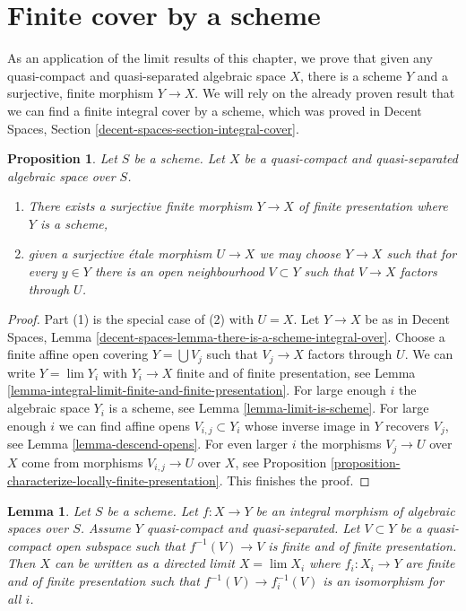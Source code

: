 \documentclass{stacks-project}
\theoremstyle{plain}
\newtheorem{proposition}[subsection]{Proposition}
\newtheorem{lemma}[subsection]{Lemma}
\theoremstyle{definition}
\theoremstyle{remark}
\numberwithin{equation}{subsection}
\def\lim{\mathop{\mathrm{lim}}\nolimits}
\begin{document}
\section{Finite cover by a scheme}
\label{section-finite-cover}

\noindent
As an application of the limit results of this chapter, we prove that given
any quasi-compact and quasi-separated algebraic space $X$, there is a scheme
$Y$ and a surjective, finite morphism $Y \to X$. We will rely on the already
proven result that we can find a finite integral cover by a scheme, which
was proved in
Decent Spaces, Section \ref{decent-spaces-section-integral-cover}.

\begin{proposition}
\label{proposition-there-is-a-scheme-finite-over}
Let $S$ be a scheme. Let $X$ be a quasi-compact and quasi-separated
algebraic space over $S$.
\begin{enumerate}
\item There exists a surjective finite morphism $Y \to X$
of finite presentation where $Y$ is a scheme,
\item given a surjective \'etale morphism $U \to X$ we may choose
$Y \to X$ such that for every $y \in Y$ there is an open neighbourhood
$V \subset Y$ such that $V \to X$ factors through $U$.
\end{enumerate}
\end{proposition}

\begin{proof}
Part (1) is the special case of (2) with $U = X$.
Let $Y \to X$ be as in
Decent Spaces, Lemma \ref{decent-spaces-lemma-there-is-a-scheme-integral-over}.
Choose a finite affine open covering $Y = \bigcup V_j$ such that $V_j \to X$
factors through $U$. We can write $Y = \lim Y_i$ with
$Y_i \to X$ finite and of finite presentation, see
Lemma \ref{lemma-integral-limit-finite-and-finite-presentation}.
For large enough $i$ the algebraic space $Y_i$ is a scheme, see
Lemma \ref{lemma-limit-is-scheme}.
For large enough $i$ we can find affine opens $V_{i, j} \subset Y_i$
whose inverse image in $Y$ recovers $V_j$, see
Lemma \ref{lemma-descend-opens}.
For even larger $i$ the morphisms $V_j \to U$ over $X$ come
from morphisms $V_{i, j} \to U$ over $X$, see Proposition
\ref{proposition-characterize-locally-finite-presentation}.
This finishes the proof.
\end{proof}

\begin{lemma}
\label{lemma-integral-limit-finite-and-finite-presentation-refined}
Let $S$ be a scheme. Let $f : X \to Y$ be an integral morphism of algebraic
spaces over $S$. Assume $Y$ quasi-compact and quasi-separated.
Let $V \subset Y$ be a quasi-compact open subspace such that
$f^{-1}(V) \to V$ is finite and of finite presentation.
Then $X$ can be written as a directed limit $X = \lim X_i$
where $f_i : X_i \to Y$ are finite and of finite presentation
such that $f^{-1}(V) \to f_i^{-1}(V)$ is an isomorphism for all $i$.
\end{lemma}
\end{document}
